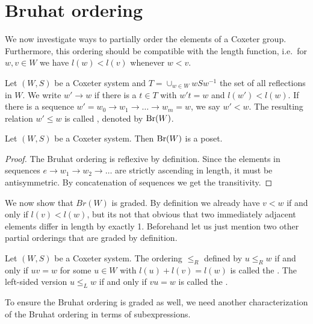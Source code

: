 \section{Bruhat ordering}
\label{sec:coxeter-groups-bruhat-ordering}

We now investigate ways to partially order the elements of a Coxeter group. Furthermore, this ordering should be compatible with the length function, i.e.\ for $w,v \in W$ we have $l(w) < l(v)$ whenever $w < v$.

\begin{defi}
	Let $(W,S)$ be a Coxeter system and $T = \cup_{w \in W} wSw^{-1}$ the set of all reflections in $W$. We write $w' \to w$ if there is a $t \in T$ with $w't = w$ and $l(w') < l(w)$. If there is a sequence $w' = w_0 \to w_1 \to \ldots \to w_m = w$, we say $w' < w$. The resulting relation $w' \leq w$ is called , denoted by $\operatorname{Br}(W)$.
\end{defi}

\begin{lemm}
	Let $(W,S)$ be a Coxeter system. Then $\operatorname{Br}(W)$ is a poset.

	\begin{proof}
		The Bruhat ordering is reflexive by definition. Since the elements in sequences $e \to w_1 \to w_2 \to \ldots$ are strictly ascending in length, it must be antisymmetric. By concatenation of sequences we get the transitivity.
	\end{proof}
\end{lemm}

We now show that $Br(W)$ is graded. By definition we already have $v < w$ if and only if $l(v) < l(w)$, but its not that obvious that two immediately adjacent elements differ in length by exactly 1. Beforehand let us just mention two other partial orderings that are graded by definition.

\begin{defi}
	Let $(W,S)$ be a Coxeter system. The ordering $\leq_R$ defined by $u \leq_R w$ if and only if $uv = w$ for some $u \in W$ with $l(u) + l(v) = l(w)$ is called the . The left-sided version $u \leq_L w$ if and only if $vu = w$ is called the .
\end{defi}

To ensure the Bruhat ordering is graded as well, we need another characterization of the Bruhat ordering in terms of subexpressions.

